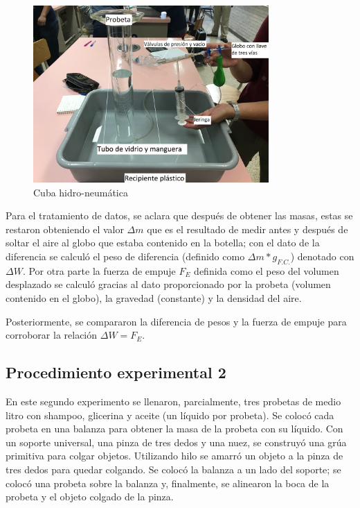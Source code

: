\documentclass[a4paper]{article}
\begin{document}
\begin{figure}[H]
    \centering
    \includegraphics[width=9cm]{Sistema.JPG}
    \caption{Cuba hidro-neumática}
\end{figure}

Para el tratamiento de datos, se aclara que después de obtener las masas, estas se restaron obteniendo el valor $\Delta m$ que es el resultado de medir antes y después de soltar el aire al globo que estaba contenido en la botella; con el dato de la diferencia se calculó el peso de diferencia (definido como $\Delta m * g_{F.C.}$) denotado con $\Delta W$. Por otra parte la fuerza de empuje $F_{E}$ definida como el peso del volumen desplazado se calculó gracias al dato proporcionado por la probeta (volumen contenido en el globo), la gravedad (constante) y la densidad del aire.

Posteriormente, se compararon la diferencia de pesos y la fuerza de empuje para corroborar la relación $\Delta W = F_{E}$.

\subsection*{Procedimiento experimental 2}
En este segundo experimento se llenaron, parcialmente, tres probetas de medio litro con shampoo, glicerina y aceite (un líquido por probeta). Se colocó cada probeta en una balanza para obtener la masa de la probeta con su líquido. Con un soporte universal, una pinza de tres dedos y una nuez, se construyó una grúa primitiva para colgar objetos. Utilizando hilo se amarró un objeto a la pinza de tres dedos para quedar colgando. Se colocó la balanza a un lado del soporte; se colocó una probeta sobre la balanza y, finalmente, se alinearon la boca de la probeta y el objeto colgado de la pinza.
\end{document}
